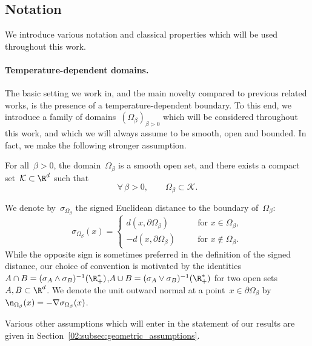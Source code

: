     \subsection{Notation}
    \label{02:subsec:notation}
    We introduce various notation and classical properties which will be used throughout this work.
    \paragraph{Temperature-dependent domains.}
    The basic setting we work in, and the main novelty compared to previous related works, is the presence of a temperature-dependent boundary. To this end, we introduce a family of domains~$\left(\Omega_\beta\right)_{\beta>0}$ which will be considered throughout this work, and which we will always assume to be smooth, open and bounded.
    In fact, we make the following stronger assumption.
    \begin{hypothesis}
        For all~$\beta>0$, the domain~$\Omega_\beta$ is a smooth open set, and there exists a compact set~$\mathcal K \subset \R^d$ such that
        \begin{equation}
            \label{02:hyp:uniformly_bounded}
            \tag{\bf H0}
            \forall\,\beta>0,\qquad\Omega_\beta \subset \mathcal K.
        \end{equation}
    \end{hypothesis}
    We denote by~$\sigma_{\Omega_\beta}$ the signed Euclidean distance to the boundary of~$\Omega_\beta$:
    \begin{equation}
        \label{02:eq:sdf}
        \sigma_{\Omega_\beta}(x) = \left\{\begin{aligned}
            d(x,\partial\Omega_\beta)&&\quad\textrm{for }x\in\Omega_\beta,\\
            -d(x,\partial\Omega_\beta)&&\quad\textrm{for }x\not\in\Omega_\beta.
        \end{aligned}\right.
    \end{equation}
    While the opposite sign is sometimes preferred in the definition of the signed distance, our choice of convention is motivated by the identities ~${A\cap B = (\sigma_A \land \sigma_B)^{-1}(\R_+^*)}$,${A\cup B = (\sigma_A \lor \sigma_B)^{-1}(\R_+^*)}$ for two open sets~$A,B\subset \R^d$.
    We denote the unit outward normal at a point~$x\in\partial \Omega_\beta$ by~$\n_{\Omega_\beta}(x) = -\nabla \sigma_{\Omega_\beta}(x)$.

    Various other assumptions which will enter in the statement of our results are given in Section~\ref{02:subsec:geometric_assumptions}.
